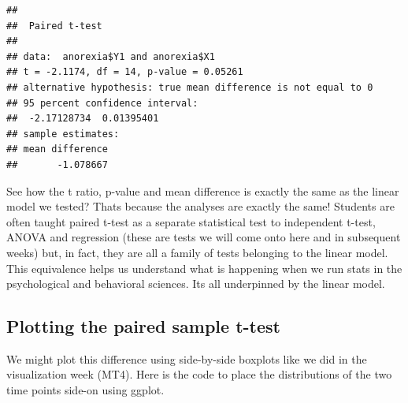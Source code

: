 \documentclass[
]{article}
\begin{document}
\begin{verbatim}
## 
##  Paired t-test
## 
## data:  anorexia$Y1 and anorexia$X1
## t = -2.1174, df = 14, p-value = 0.05261
## alternative hypothesis: true mean difference is not equal to 0
## 95 percent confidence interval:
##  -2.17128734  0.01395401
## sample estimates:
## mean difference 
##       -1.078667
\end{verbatim}

See how the t ratio, p-value and mean difference is exactly the same as
the linear model we tested? Thats because the analyses are exactly the
same! Students are often taught paired t-test as a separate statistical
test to independent t-test, ANOVA and regression (these are tests we
will come onto here and in subsequent weeks) but, in fact, they are all
a family of tests belonging to the linear model. This equivalence helps
us understand what is happening when we run stats in the psychological
and behavioral sciences. Its all underpinned by the linear model.

\subsection{Plotting the paired sample
t-test}\label{plotting-the-paired-sample-t-test}

We might plot this difference using side-by-side boxplots like we did in
the visualization week (MT4). Here is the code to place the
distributions of the two time points side-on using ggplot.
\end{document}
